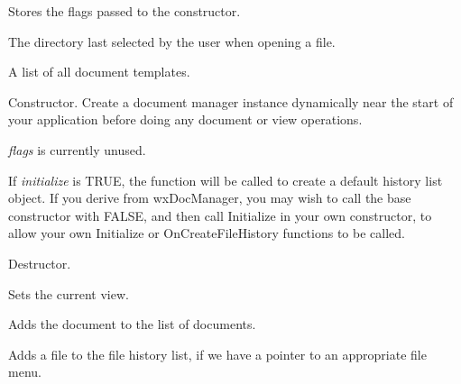 

Stores the flags passed to the constructor.


The directory last selected by the user when opening a file.




A list of all document templates.



Constructor. Create a document manager instance dynamically near the start of your application
before doing any document or view operations.

{\it flags} is currently unused.

If {\it initialize} is TRUE, the  function will be called
to create a default history list object. If you derive from wxDocManager, you may wish to call the
base constructor with FALSE, and then call Initialize in your own constructor, to allow
your own Initialize or OnCreateFileHistory functions to be called.



Destructor.



Sets the current view.



Adds the document to the list of documents.



Adds a file to the file history list, if we have a pointer to an appropriate file menu.

